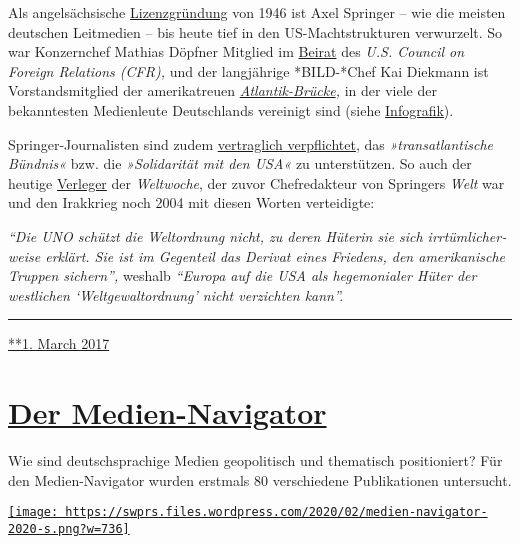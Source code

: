 Als angel­säch­sische
\href{https://de.wikipedia.org/wiki/Lizenzzeitung}{Li­zenz­grün­dung}
von 1946 ist Axel Springer -- wie die meisten deutschen Leit­medien --
bis heute tief in den US-Macht­­struk­turen ver­wur­zelt. So war
Konzern­­chef Mathias Döpfner Mit­glied im
\href{https://www.cfr.org/global-board-advisors}{Bei­rat} des \emph{U.S.
Council on Foreign Relations (CFR),} und der lang­jährige *BILD-*​Chef
Kai Diek­­mann ist Vor­stands­mitglied der ame­ri­ka­treuen
\emph{\href{https://de.wikipedia.org/wiki/Atlantik-Br\%C3\%BCcke}{Atlantik-Brücke},}
in der viele der bekanntesten Medien­leute Deutsch­lands ver­ei­nigt
sind (siehe
\href{https://swprs.org/netzwerk-medien-deutschland/}{Infografik}).

Springer-Journa­listen sind zudem
\href{https://bildblog.de/89290/axel-springer-gibt-sich-neue-alte-grundsaetze/}{ver­­trag­­lich
ver­pfli­ch­tet}, das \emph{»trans­at­lantische Bündnis«} bzw. die
\emph{»Soli­da­rität mit den USA«} zu unter­stützen. So auch der heutige
\href{https://de.wikipedia.org/wiki/Roger_K\%C3\%B6ppel}{Ver­leger} der
\emph{Welt­woche}, der zuvor Chef­re­dakteur von Springers \emph{Welt}
war und den Irak­krieg noch 2004 mit diesen Worten ver­tei­digte:

\emph{``Die UNO schützt die Welt­ordnung nicht, zu deren Hüterin sie
sich irr­tüm­licher­weise erklärt. Sie ist im Gegen­teil das Derivat
eines Friedens, den ameri­ka­nische Truppen sichern'',} weshalb
\emph{``Europa auf die USA als hege­mon­ialer Hüter der west­lichen
`Welt­gewalt­ordnung' nicht ver­zichten kann''.}

\begin{center}\rule{0.5\linewidth}{\linethickness}\end{center}

\href{https://swprs.org/2017/03/01/eine-bruecke-ueber-den-atlantik/}{**1.
March 2017}

\hypertarget{der-medien-navigator}{%
\section{\texorpdfstring{\href{https://swprs.org/2017/03/01/der-medien-navigator/}{Der
Medien-Navigator}}{Der Medien-Navigator}}\label{der-medien-navigator}}

Wie sind deutsch­spra­chige Medien geo­po­li­tisch und the­matisch
posi­tio­niert? Für den Medien-Navi­gator wurden erst­mals 80
verschiedene Publi­ka­tionen unter­sucht.

\href{https://swprs.org/medien-navigator/}{\texttt{[image: https://swprs.files.wordpress.com/2020/02/medien-navigator-2020-s.png?w=736]}}

